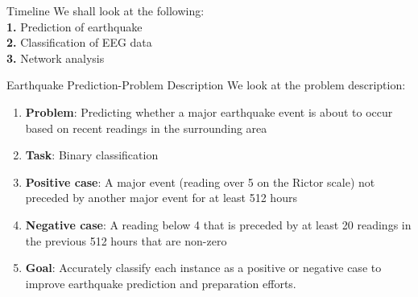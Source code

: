 







\begin{frame}{Timeline}    
   We shall look at the following:\\
   \textbf{1.} Prediction of earthquake\pause\\
   \textbf{2.} Classification of EEG data\pause\\
   \textbf{3.} Network analysis
\end{frame}



\begin{frame}{Earthquake Prediction-Problem Description}
We look at the problem description:
    \begin{enumerate}[$\bullet$]
        \item \textbf{Problem}: Predicting whether a major earthquake event is about to occur based on recent readings in the surrounding area\pause
        \item \textbf{Task}: Binary classification\pause
        \item \textbf{Positive case}: A major event (reading over 5 on the Rictor scale) not preceded by another major event for at least 512 hours\pause
        \item \textbf{Negative case}: A reading below 4 that is preceded by at least 20 readings in the previous 512 hours that are non-zero\pause
        \item \textbf{Goal}: Accurately classify each instance as a positive or negative case to improve earthquake prediction and preparation efforts.
    \end{enumerate}
\end{frame}





